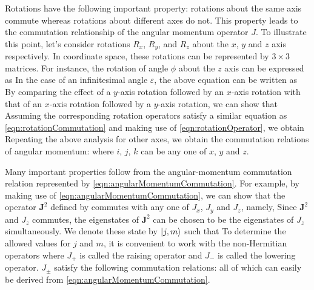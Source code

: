 Rotations have the following important property:  rotations about the same axis commute whereas rotations about 
different axes do not.  This property leads to the commutation relationship of the angular momentum operator $J$. 
To illustrate this point, let's consider rotations $R_x$, $R_y$, and $R_z$ about the $x$, $y$ and $z$ axis respectively. In 
coordinate space, these rotations can be represented by $3\times 3$ matrices. For instance, the rotation of angle $\phi$ about the $z$ axis can be expressed as
In the case of an infinitesimal angle $\varepsilon$, the above equation can be written as
By comparing the effect of a $y$-axis rotation followed by an $x$-axis rotation with that of an $x$-axis rotation 
followed by a $y$-axis rotation, we can show that 
Assuming the corresponding rotation operators satisfy a similar equation as \autoref{eqn:rotationCommutation} and
making use of \autoref{eqn:rotationOperator}, we obtain
Repeating the above analysis for other axes, we obtain the commutation relations of angular momentum:
where $i$, $j$, $k$ can be any one of $x$, $y$ and $z$. 

Many important properties follow from the angular-momentum commutation relation represented by \autoref{eqn:angularMomentumCommutation}. For example, by making use of \autoref{eqn:angularMomentumCommutation}, we can show that the operator $\mathbf{J}^2$ defined by
commutes with any one of $J_x$, $J_y$ and $J_z$, namely,
Since $\mathbf{J}^2$ and $J_z$ commutes, the eigenstates of $\mathbf{J}^2$ can be chosen to be the eigenstates of
$J_z$ simultaneously. We denote these state by $| j, m \rangle$ such that
To determine the allowed values for $j$ and $m$, it is convenient to work with the non-Hermitian operators
where $J_{+}$ is called the raising operator and $J_{-}$ is called the lowering operator. $J_{\pm}$ satisfy the following
commutation relations:
all of which can easily be derived from \autoref{eqn:angularMomentumCommutation}. 

